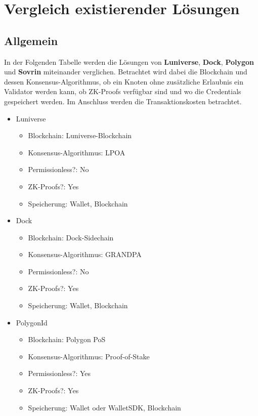 \chapter{Vergleich existierender Lösungen}
\label{cha:vergleich Lösungen}
\section{Allgemein}
In der Folgenden Tabelle werden die Lösungen von \textbf{Luniverse}, \textbf{Dock}, \textbf{Polygon} und \textbf{Sovrin} miteinander verglichen. Betrachtet wird dabei die Blockchain und dessen Konsensus-Algorithmus, ob ein Knoten ohne zusätzliche Erlaubnis ein Validator werden kann, ob ZK-Proofs verfügbar sind und wo die Credentials gespeichert werden. Im Anschluss werden die Transaktionskosten betrachtet.

\begin{itemize}
	
	
	
	\item Luniverse
	\begin{itemize}
		\item Blockchain: Luniverse-Blockchain
		\item Konsensus-Algorithmus: LPOA
		\item Permissionless?: No
		\item ZK-Proofs?: Yes
		\item Speicherung: Wallet, Blockchain
	\end{itemize}
	
	\item Dock
	\begin{itemize}
		\item Blockchain: Dock-Sidechain
		\item Konsensus-Algorithmus: GRANDPA
		\item Permissionless?: No
		\item ZK-Proofs?: Yes
		\item Speicherung: Wallet, Blockchain
	\end{itemize}
	
	\item PolygonId
	\begin{itemize}
		\item Blockchain: Polygon PoS
		\item Konsensus-Algorithmus: Proof-of-Stake
		\item Permissionless?: Yes
		\item ZK-Proofs?: Yes
		\item Speicherung: Wallet oder WalletSDK, Blockchain
	\end{itemize}
	

\end{itemize}
